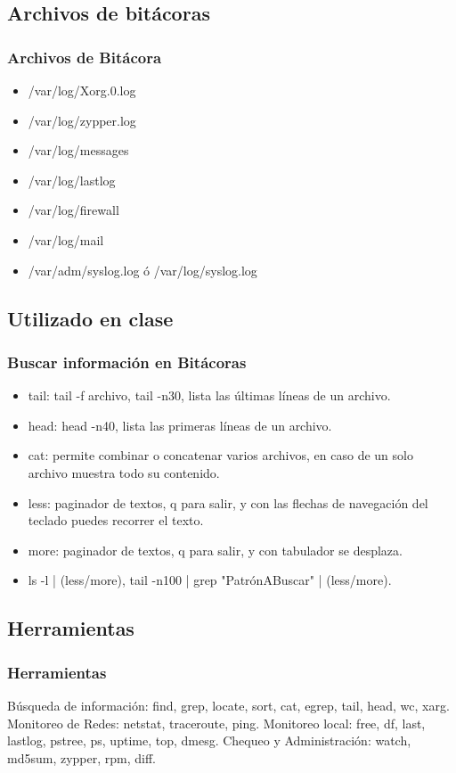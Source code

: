 \documentclass{beamer}
\begin{document}
\subsection{Archivos de bit\'acoras}
\begin{frame}
\frametitle{Archivos de Bit\'acora}
\begin{itemize}
\item /var/log/Xorg.0.log
\item /var/log/zypper.log
\item /var/log/messages
\item /var/log/lastlog
\item /var/log/firewall
\item /var/log/mail
\item /var/adm/syslog.log \'o /var/log/syslog.log
\end{itemize}
\end{frame}

\subsection{Utilizado en clase}
\begin{frame}
\frametitle{Buscar informaci\'on en Bit\'acoras}
\begin{itemize}
\item \alert{tail}: tail -f archivo, tail -n30, lista las \'ultimas l\'ineas de un archivo.
\item \alert{head}: head -n40, lista las primeras l\'ineas de un archivo.
\item \alert{cat}: permite combinar o concatenar varios archivos, en caso de un solo archivo muestra todo su contenido.
\item \alert{less}: paginador de textos, q para salir, y con las flechas de navegaci\'on del teclado puedes recorrer el texto.
\item \alert{more}: paginador de textos, q para salir, y con tabulador se desplaza.
\\
\item ls -l | (less/more), tail -n100 | grep "Patr\'onABuscar" | (less/more).
\end{itemize}
\end{frame}

\subsection{Herramientas}
\begin{frame}
\frametitle{Herramientas}
B\'usqueda de informaci\'on:  find, grep, locate, sort, cat, egrep, tail, head, wc, xarg.
Monitoreo de Redes: netstat, traceroute, ping.
Monitoreo local: free, df, last, lastlog, pstree, ps, uptime, top, dmesg.
Chequeo y Administraci\'on: watch, md5sum, zypper, rpm, diff.
\end{frame}
\end{document}
